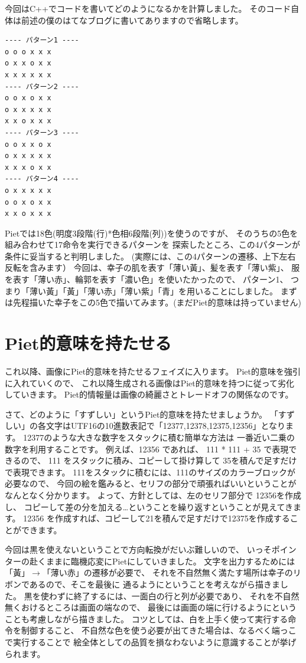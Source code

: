 今回はC++でコードを書いてどのようになるかを計算しました。
そのコード自体は前述の僕のはてなブログに書いてありますので省略します。

\begin{verbatim}
---- パターン1 ----
o o o x x x
o x x o x x
x x x x x x
---- パターン2 ----
o o x o x x
o x x x x x
x x o x x x
---- パターン3 ----
o o x x o x
o x x x x x
x x x o x x
---- パターン4 ----
o x x x x x
o o x o x x
x x o x x x
\end{verbatim}

Pietでは18色(明度3段階(行)*色相6段階(列))を使うのですが、
そのうちの5色を組み合わせて17命令を実行できるパターンを
探索したところ、この4パターンが条件に妥当すると判明しました。
(実際には、この4パターンの遷移、上下左右反転を含みます）
今回は、幸子の肌を表す「薄い黃」、髪を表す「薄い紫」、
服を表す「薄い赤」、輪郭を表す「濃い色」を使いたかったので、
パターン1、
つまり「薄い黃」「黃」「薄い赤」「薄い紫」「青」を用いることにしました。
まずは先程描いた幸子をこの5色で描いてみます。(まだPiet的意味は持っていません)


\section{Piet的意味を持たせる}

これ以降、画像にPiet的意味を持たせるフェイズに入ります。
Piet的意味を強引に入れていくので、
これ以降生成される画像はPiet的意味を持つに従って劣化していきます。
Piet的情報量は画像の綺麗さとトレードオフの関係なのです。

さて、どのように「すずしい」というPiet的意味を持たせましょうか。
「すずしい」の各文字はUTF16の10進数表記で「12377,12378,12375,12356」となります。
12377のような大きな数字をスタックに積む簡単な方法は
一番近い二乗の数字を利用することです。 例えば、12356 であれば、 111 *
111 + 35 で表現できるので、 111 をスタックに積み、コピーして掛け算して
35を積んで足すだけで表現できます。
111をスタックに積むには、111のサイズのカラーブロックが必要なので、
今回の絵を鑑みると、セリフの部分で頑張ればいいということがなんとなく分かります。
よって、方針としては、左のセリフ部分で 12356を作成し、
コピーして差の分を加える\ldots{}ということを繰り返すということが見えてきます。
12356
を作成すれば、コピーして21を積んで足すだけで12375を作成することができます。

今回は黒を使えないということで方向転換がだいぶ難しいので、
いっそポインターの赴くままに臨機応変にPietにしていきました。
文字を出力するためには 「黃」$ \to $「薄い赤」の遷移が必要で、
それを不自然無く満たす場所は幸子のリボンであるので、そこを最後に
通るようにということを考えながら描きました。
黒を使わずに終了するには、一面白の行と列が必要であり、
それを不自然無くおけるところは画面の端なので、
最後には画面の端に行けるようにということも考慮しながら描きました。
コツとしては、白を上手く使って実行する命令を制御すること、
不自然な色を使う必要が出てきた場合は、なるべく端っこで実行することで
絵全体としての品質を損なわないように意識することが挙げられます。


